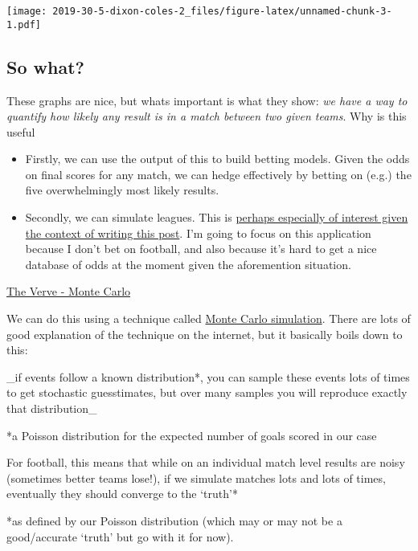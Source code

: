 \documentclass[
]{article}
\providecommand{\tightlist}{%
  \setlength{\itemsep}{0pt}\setlength{\parskip}{0pt}}
\begin{document}
\texttt{[image: 2019-30-5-dixon-coles-2\_files/figure-latex/unnamed-chunk-3-1.pdf]}

\hypertarget{so-what}{%
\subsection{So what?}\label{so-what}}

These graphs are nice, but whats important is what they show: \emph{we
have a way to quantify how likely any result is in a match between two
given teams}. Why is this useful

\begin{itemize}
\tightlist
\item
  Firstly, we can use the output of this to build betting models. Given
  the odds on final scores for any match, we can hedge effectively by
  betting on (e.g.) the five overwhelmingly most likely results.
\item
  Secondly, we can simulate leagues. This is
  \href{https://www.bloomberg.com/graphics/2020-coronavirus-european-football/}{perhaps
  especially of interest given the context of writing this post}. I'm
  going to focus on this application because I don't bet on football,
  and also because it's hard to get a nice database of odds at the
  moment given the aforemention situation.
\end{itemize}

\href{https://www.youtube.com/watch?v=DYb8gS-wDrM}{The Verve - Monte
Carlo}

We can do this using a technique called
\href{https://en.wikipedia.org/wiki/Monte_Carlo_method}{Monte Carlo
simulation}. There are lots of good explanation of the technique on the
internet, but it basically boils down to this:

\_if events follow a known distribution*, you can sample these events
lots of times to get stochastic guesstimates, but over many samples you
will reproduce exactly that distribution\_

*a Poisson distribution for the expected number of goals scored in our
case

For football, this means that while on an individual match level results
are noisy (sometimes better teams lose!), if we simulate matches lots
and lots of times, eventually they should converge to the `truth'*

*as defined by our Poisson distribution (which may or may not be a
good/accurate `truth' but go with it for now).
\end{document}
